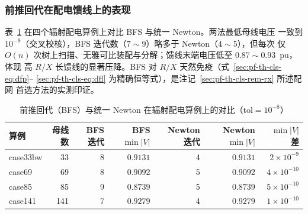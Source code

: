 \subsubsection{前推回代在配电馈线上的表现}
表~\ref{tab:pf-th-cls-bfs} 在四个辐射配电算例上对比 BFS 与统一 Newton。两法最低母线电压
一致到 $10^{-9}$（交叉校核），BFS 迭代数（$7\sim9$）略多于 Newton（$4\sim5$），但每次
仅 $O(n)$ 次树上扫描、无雅可比装配与分解；馈线末端电压低至 $0.87\sim0.93$~pu，体现
高 $R/X$ 长馈线的显著压降。BFS 对 $R/X$ 天然免疫（式~\eqref{sec:pf-th-cls-eq:dfp}--%
\eqref{sec:pf-th-cls-eq:dfl} 为精确恒等式），是注记~\ref{sec:pf-th-cls-rem-rx} 所述配网
首选方法的实测印证。
\begin{table}[H]\centering\footnotesize
\caption{前推回代（BFS）与统一 Newton 在辐射配电算例上的对比（$\mathrm{tol}=10^{-8}$）}
\label{tab:pf-th-cls-bfs}
\begin{tabular}{@{}lrrrrrr@{}}
\toprule
算例 & 母线数 & BFS 迭代 & BFS $\min|V|$ & Newton 迭代 & Newton $\min|V|$ & $\min|V|$ 差\\
\midrule
case33bw & 33  & 8 & $0.9131$ & 4 & $0.9131$ & $2\times10^{-9}$\\
case69   & 69  & 8 & $0.9092$ & 5 & $0.9092$ & $4\times10^{-10}$\\
case85   & 85  & 9 & $0.8739$ & 5 & $0.8739$ & $5\times10^{-10}$\\
case141  & 141 & 7 & $0.9279$ & 4 & $0.9279$ & $1\times10^{-10}$\\
\bottomrule
\end{tabular}
\end{table}

